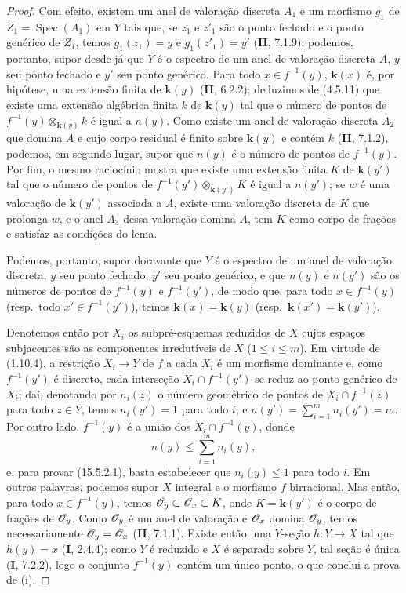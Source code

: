 \begin{proof}
Com efeito, existem um anel de valoração discreta $A_1$ e um morfismo $g_1$ de $Z_1=\operatorname{Spec}(A_1)$ em $Y$ tais que, se $z_1$ e $z'_1$ são o ponto fechado e o ponto genérico de $Z_1$,
temos $g_1(z_1)=y$ e $g_1(z'_1)=y'$ (\textbf{II}, 7.1.9); podemos, portanto, supor desde já que $Y$ é o espectro de um anel de valoração discreta $A$, $y$ seu ponto fechado e $y'$ seu ponto genérico. Para todo $x\in f^{-1}(y)$, $\mathbf{k}(x)$ é, por hipótese, uma extensão finita de $\mathbf{k}(y)$ (\textbf{II}, 6.2.2); deduzimos de (4.5.11) que existe uma extensão algébrica finita $k$ de $\mathbf{k}(y)$ tal que o número de pontos de $f^{-1}(y)\otimes_{\mathbf{k}(y)}k$ é igual a $n(y)$. Como existe um anel de valoração discreta $A_2$ que domina $A$ e cujo corpo residual é finito sobre $\mathbf{k}(y)$ e contém $k$ (\textbf{II}, 7.1.2), podemos, em segundo lugar, supor que $n(y)$ é o número de pontos de $f^{-1}(y)$. Por fim, o mesmo raciocínio mostra que existe uma extensão finita $K$ de $\mathbf{k}(y')$ tal que o número de pontos de $f^{-1}(y')\otimes_{\mathbf{k}(y')}K$ é igual a $n(y')$; se $w$ é uma valoração de $\mathbf{k}(y')$ associada a $A$, existe uma valoração discreta de $K$ que prolonga $w$, e o anel $A_3$ dessa valoração domina $A$, tem $K$ como corpo de frações e satisfaz as condições do lema.

Podemos, portanto, supor doravante que $Y$ é o espectro de um anel de valoração discreta, $y$ seu ponto fechado, $y'$ seu ponto genérico, e que $n(y)$ e $n(y')$ são os números de pontos de $f^{-1}(y)$ e $f^{-1}(y')$, de modo que, para todo $x\in f^{-1}(y)$ (resp.\ todo $x'\in f^{-1}(y')$), temos $\mathbf{k}(x)=\mathbf{k}(y)$ (resp.\ $\mathbf{k}(x')=\mathbf{k}(y')$).

Denotemos então por $X_i$ os subpré-esquemas reduzidos de $X$ cujos espaços subjacentes são as componentes irredutíveis de $X$ ($1\leqslant i\leqslant m$). Em virtude de (1.10.4), a restrição $X_i\to Y$ de $f$ a cada $X_i$ é um morfismo dominante e, como $f^{-1}(y')$ é discreto, cada interseção $X_i\cap f^{-1}(y')$ se reduz ao ponto genérico de $X_i$; daí, denotando por $n_i(z)$ o número geométrico de pontos de $X_i\cap f^{-1}(z)$ para todo $z\in Y$, temos $n_i(y')=1$ para todo $i$, e $n(y')=\sum_{i=1}^{m}n_i(y')=m$. Por outro lado, $f^{-1}(y)$ é a união dos $X_i\cap f^{-1}(y)$, donde
\begin{equation}
\tag{15.5.2.3}
\label{IV.15.5.2.3}
  n(y)\leqslant\sum_{i=1}^{m}n_i(y),
\end{equation}
e, para provar (15.5.2.1), basta estabelecer que $n_i(y)\leqslant 1$ para todo $i$. Em outras palavras, podemos supor $X$ integral e o morfismo $f$ birracional. Mas então, para todo $x\in f^{-1}(y)$, temos $\mathscr{O}_y\subset\mathscr{O}_x\subset K$, onde $K=\mathbf{k}(y')$ é o corpo de frações de $\mathscr{O}_y$. Como $\mathscr{O}_y$ é um anel de valoração e $\mathscr{O}_x$ domina $\mathscr{O}_y$, temos necessariamente $\mathscr{O}_y=\mathscr{O}_x$ (\textbf{II}, 7.1.1). Existe então uma $Y$-seção $h:Y\to X$ tal que $h(y)=x$ (\textbf{I}, 2.4.4); como $Y$ é reduzido e $X$ é separado sobre $Y$, tal seção é única (\textbf{I}, 7.2.2), logo o conjunto $f^{-1}(y)$ contém um único ponto, o que conclui a prova de (i).


\end{proof}

